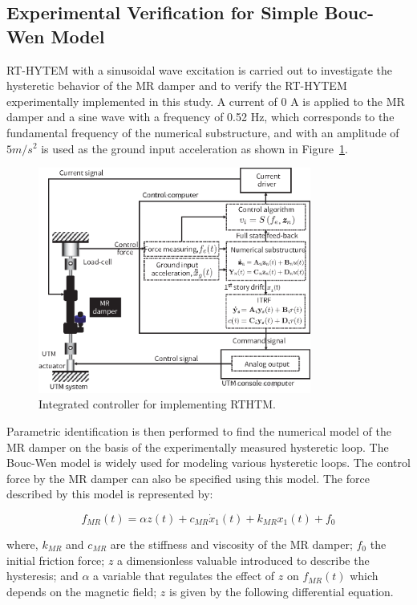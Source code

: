 \subsection{Experimental Verification for Simple Bouc-Wen Model}

RT-HYTEM with a sinusoidal wave excitation is carried out to investigate the hysteretic behavior of the MR damper and to verify the RT-HYTEM experimentally implemented in this study. A current of 0 A is applied to the MR damper and a sine wave with a frequency of 0.52 Hz, which corresponds to the fundamental frequency of the numerical substructure, and with an amplitude of $5m/s^{2}$ is used as the ground input acceleration as shown in Figure~\ref{fig:8-7}.

\begin{figure}[H]
\centering
\includegraphics[width=0.8\textwidth] {figure/8-7.eps}
\caption{Integrated controller for implementing RTHTM.}
\label{fig:8-7}
\end{figure}

Parametric identification is then performed to find the numerical model of the MR damper on the basis of the experimentally measured hysteretic loop. The Bouc-Wen model is widely used for modeling various hysteretic loops\citep{wen1976method}. The control force by the MR damper can also be specified using this model. The force described by this model is represented by:

\begin{equation}\label{eq:8-13}
f_{MR}(t) = \alpha z(t) + c_{MR}\dot{x}_{1}(t) + k_{MR}x_{1}(t) + f_{0}
\end{equation}

where, $k_{MR}$ and $c_{MR}$ are the stiffness and viscosity of the MR damper; $f_{0}$ the initial friction force; $z$ a dimensionless valuable introduced to describe the hysteresis; and $\alpha$ a variable that regulates the effect of $z$ on $f_{MR}(t)$ which depends on the magnetic field; $z$ is given by the following differential equation.

